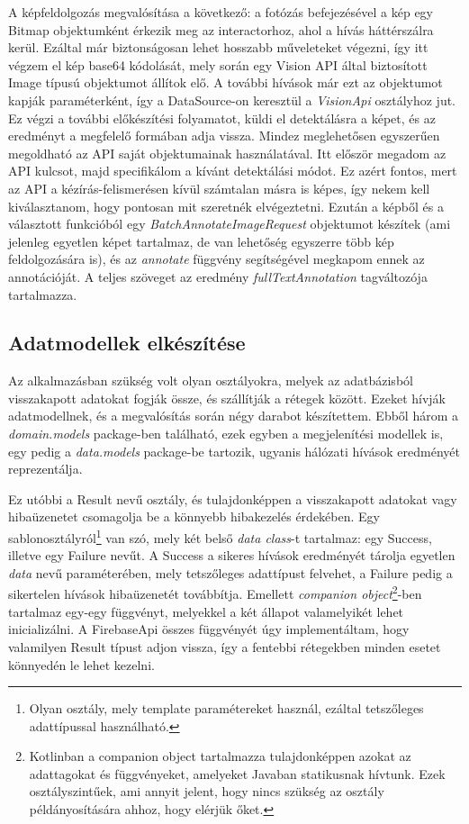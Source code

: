 A képfeldolgozás megvalósítása a következő: a fotózás befejezésével a kép egy Bitmap objektumként érkezik meg az interactorhoz, ahol a hívás háttérszálra kerül. Ezáltal már biztonságosan lehet hosszabb műveleteket végezni, így itt végzem el kép base64 kódolását, mely során egy Vision API által biztosított Image típusú objektumot állítok elő. A további hívások már ezt az objektumot kapják paraméterként, így a DataSource-on keresztül a \emph{VisionApi} osztályhoz jut. Ez végzi a további előkészítési folyamatot, küldi el detektálásra a képet, és az eredményt a megfelelő formában adja vissza. Mindez meglehetősen egyszerűen megoldható az API saját objektumainak használatával. Itt először megadom az API kulcsot, majd specifikálom a kívánt detektálási módot. Ez azért fontos, mert az API a kézírás-felismerésen kívül számtalan másra is képes, így nekem kell kiválasztanom, hogy pontosan mit szeretnék elvégeztetni. Ezután a képből és a választott funkcióból egy \emph{BatchAnnotateImageRequest} objektumot készítek (ami jelenleg egyetlen képet tartalmaz, de van lehetőség egyszerre több kép feldolgozására is), és az \emph{annotate} függvény segítségével megkapom ennek az annotációját. A teljes szöveget az eredmény \emph{fullTextAnnotation} tagváltozója tartalmazza.

\subsection{Adatmodellek elkészítése} 
Az alkalmazásban szükség volt olyan osztályokra, melyek az adatbázisból visszakapott adatokat fogják össze, és szállítják a rétegek között. Ezeket hívják adatmodellnek, és a megvalósítás során négy darabot készítettem. Ebből három a \emph{domain.models} package-ben található, ezek egyben a megjelenítési modellek is, egy pedig a \emph{data.models} package-be tartozik, ugyanis hálózati hívások eredményét reprezentálja.

Ez utóbbi a Result nevű osztály, és tulajdonképpen a visszakapott adatokat vagy hibaüzenetet csomagolja be a könnyebb hibakezelés érdekében. Egy sablonosztályról\footnote{Olyan osztály, mely template paramétereket használ, ezáltal tetszőleges adattípussal használható.} van szó, mely két belső \emph{data class}-t tartalmaz: egy Success, illetve egy Failure nevűt. A Success a sikeres hívások eredményét tárolja egyetlen \emph{data} nevű paraméterében, mely tetszőleges adattípust felvehet, a Failure pedig a sikertelen hívások hibaüzenetét továbbítja. Emellett \emph{companion object}\footnote{Kotlinban a companion object tartalmazza tulajdonképpen azokat az adattagokat és függvényeket, amelyeket Javaban statikusnak hívtunk. Ezek osztályszintűek, ami annyit jelent, hogy nincs szükség az osztály példányosítására ahhoz, hogy elérjük őket.}-ben tartalmaz egy-egy függvényt, melyekkel a két állapot valamelyikét lehet inicializálni. A FirebaseApi összes függvényét úgy implementáltam, hogy valamilyen Result típust adjon vissza, így a fentebbi rétegekben minden esetet könnyedén le lehet kezelni. 

